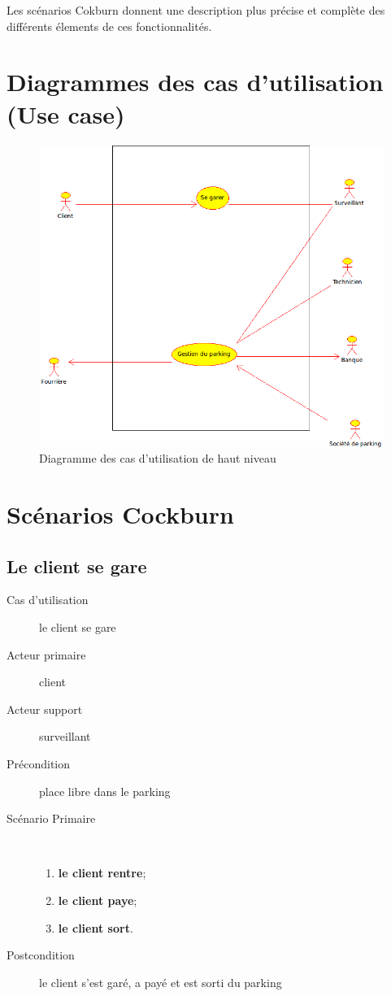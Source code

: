 \documentclass[a4paper]{article}
\begin{document}
Les sc\'enarios Cokburn donnent une description plus pr\'ecise et compl\`ete des diff\'erents
\'elements de ces fonctionnalit\'es.

\section{Diagrammes des cas d'utilisation (Use case)}
\begin{figure}[!ht]
	\centering
	\includegraphics[scale=.7]{parking.png}
	\caption{\label{usecase} Diagramme des cas d'utilisation de haut niveau}
\end{figure}

\section{Sc\'enarios Cockburn}
\subsection{Le client se gare}
\begin{description}
	\item[Cas d'utilisation] le client se gare
	\item[Acteur primaire] client
	\item[Acteur support] surveillant
	\item[Pr\'econdition] place libre dans le parking
	\item[Sc\'enario Primaire] \
	\begin{enumerate}
		\item \textbf{le client rentre};
		\item \textbf{le client paye};
		\item \textbf{le client sort}.
	\end{enumerate}
	\item[Postcondition] le client s'est gar\'e, a pay\'e et est sorti du parking
\end{description}
\end{document}

